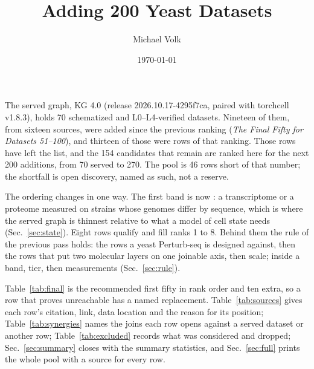 \documentclass[10pt,a4paper]{article}
\title{\vspace{-1.5em}Adding 200 Yeast Datasets}
\author{Michael Volk}
\date{\today}
\begin{document}
\maketitle
\thispagestyle{empty}

\noindent
The served graph, KG 4.0 (release 2026.10.17-4295f7ca, paired with torchcell v1.8.3),
holds 70 schematized and L0--L4-verified  datasets. Nineteen
of them, from sixteen sources, were added since the previous ranking
(\emph{The Final Fifty for Datasets 51--100}), and thirteen of those were rows of that
ranking. Those rows have left the list, and the 154 candidates that remain are ranked here
for the next 200 additions, from 70 served to 270. The pool is 46 rows short of that
number; the shortfall is open discovery, named as such, not a reserve.

The ordering changes in one way. The first band is now : a
transcriptome or a proteome measured on strains whose genomes differ by sequence, which is
where the served graph is thinnest relative to what a model of cell state needs
(Sec.~\ref{sec:state}). Eight rows qualify and fill ranks 1 to 8. Behind them the rule of
the previous pass holds: the rows a yeast Perturb-seq is designed against, then the rows
that put two molecular layers on one joinable axis, then scale; inside a band, tier, then
measurements (Sec.~\ref{sec:rule}).

Table~\ref{tab:final} is the recommended first fifty in rank order and ten extra, so a row
that proves unreachable has a named replacement. Table~\ref{tab:sources} gives each row's
citation, link, data location and the reason for its position; Table~\ref{tab:synergies}
names the joins each row opens against a served dataset or another row;
Table~\ref{tab:excluded} records what was considered and dropped; Sec.~\ref{sec:summary}
closes with the summary statistics, and Sec.~\ref{sec:full} prints the whole pool with a
source for every row.

\vspace{0.5em}
\tccontents
\clearpage








\end{document}

